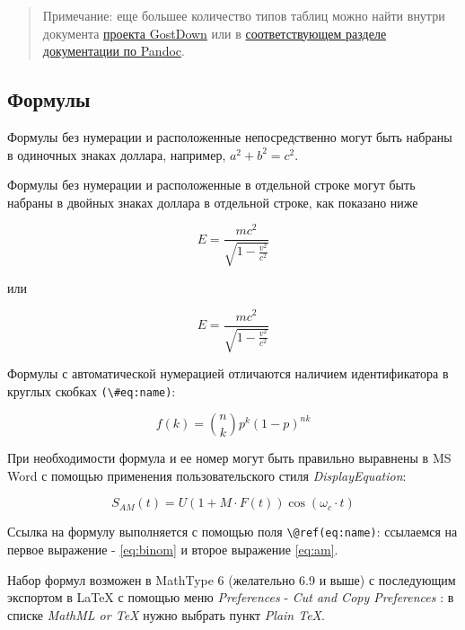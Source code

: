 \documentclass[
  a4paper,
]{book}
\theoremstyle{definition}
\theoremstyle{definition}
\theoremstyle{definition}
\theoremstyle{definition}
\theoremstyle{remark}
\begin{document}
\begin{quote}
Примечание: еще большее количество типов таблиц можно найти внутри документа \href{https://gitlab.iaaras.ru/iaaras/gostdown/blob/master/demo-main.md}{проекта GostDown} или в \href{https://pandoc.org/MANUAL.html\#tables}{соответствующем разделе документации по Pandoc}.
\end{quote}

\hypertarget{markdown-syntax-math}{%
\subsection{Формулы}\label{markdown-syntax-math}}

Формулы без нумерации и расположенные непосредственно могут быть набраны в одиночных знаках доллара, например, \(a^2 + b^2 = c^2\).

Формулы без нумерации и расположенные в отдельной строке могут быть набраны в двойных знаках доллара в отдельной строке, как показано ниже

\[ E = \frac{mc^2}{\sqrt{1-\frac{v^2}{c^2}}} \]

или

\[
E = \frac{mc^2}{\sqrt{1-\frac{v^2}{c^2}}}
\]

Формулы с автоматической нумерацией отличаются наличием идентификатора в круглых скобках \texttt{(\textbackslash{}\#eq:name)}:

\begin{equation}
f\left(k\right) =\binom{n}{k} p^k\left(1-p\right)^{n k}
\label{eq:binom}
\end{equation}

При необходимости формула и ее номер могут быть правильно выравнены в MS Word с помощью применения пользовательского стиля \emph{DisplayEquation}:

\begin{equation}
S_{AM}\left( t \right) = U\left( 1+M\cdot F\left( t \right) \right)\cos \left( \omega_c\cdot t \right)
\label{eq:am}
\end{equation}

Ссылка на формулу выполняется с помощью поля \texttt{\textbackslash{}@ref(eq:name)}: ссылаемся на первое выражение - \eqref{eq:binom} и второе выражение \eqref{eq:am}.

Набор формул возможен в MathType 6 (желательно 6.9 и выше) с последующим экспортом в LaTeX с помощью меню \emph{Preferences} - \emph{Cut and Copy Preferences} : в списке \emph{MathML or TeX} нужно выбрать пункт \emph{Plain TeX}.
\end{document}
